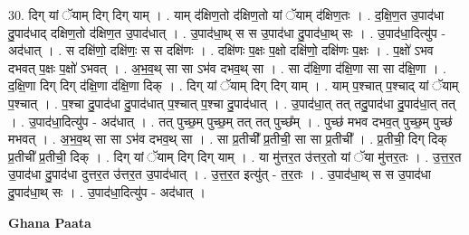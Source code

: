 \documentclass[17pt]{extarticle}
\begin{document}
30. दिग् यां ॅयाम् दिग् दिग् याम् । . याम् द॑क्षिण॒तो द॑क्षिण॒तो यां ॅयाम् द॑क्षिण॒तः । . द॒क्षि॒ण॒त उ॒पाद॑धा दु॒पाद॑धाद् दक्षिण॒तो द॑क्षिण॒त उ॒पाद॑धात् । . उ॒पाद॑धा॒थ् स स उ॒पाद॑धा दु॒पाद॑धा॒थ् सः । . उ॒पाद॑धा॒दित्यु॑प - अद॑धात् । . स दक्षि॑णो॒ दक्षि॑णः॒ स स दक्षि॑णः । . दक्षि॑णः प॒क्षः प॒क्षो दक्षि॑णो॒ दक्षि॑णः प॒क्षः । . प॒क्षो॑ ऽभव दभवत् प॒क्षः प॒क्षो॑ ऽभवत् । . अ॒भ॒व॒थ् सा सा ऽभ॑व दभव॒थ् सा । . सा द॑क्षि॒णा द॑क्षि॒णा सा सा द॑क्षि॒णा । . द॒क्षि॒णा दिग् दिग् द॑क्षि॒णा द॑क्षि॒णा दिक् । . दिग् यां ॅयाम् दिग् दिग् याम् । . याम् प॒श्चात् प॒श्चाद् यां ॅयाम् प॒श्चात् । . प॒श्चा दु॒पाद॑धा दु॒पाद॑धात् प॒श्चात् प॒श्चा दु॒पाद॑धात् । . उ॒पाद॑धा॒त् तत् तदु॒पाद॑धा दु॒पाद॑धा॒त् तत् । . उ॒पाद॑धा॒दित्यु॑प - अद॑धात् । . तत् पुच्छ॒म् पुच्छ॒म् तत् तत् पुच्छ᳚म् । . पुच्छ॑ मभव दभव॒त् पुच्छ॒म् पुच्छ॑ मभवत् । . अ॒भ॒व॒थ् सा सा ऽभ॑व दभव॒थ् सा । . सा प्र॒तीची᳚ प्र॒तीची॒ सा सा प्र॒तीची᳚ । . प्र॒तीची॒ दिग् दिक् प्र॒तीची᳚ प्र॒तीची॒ दिक् । . दिग् यां ॅयाम् दिग् दिग् याम् । . या मु॑त्तर॒त उ॑त्तर॒तो यां ॅया मु॑त्तर॒तः । . उ॒त्त॒र॒त उ॒पाद॑धा दु॒पाद॑धा दुत्तर॒त उ॑त्तर॒त उ॒पाद॑धात् । . उ॒त्त॒र॒त इत्यु॑त् - त॒र॒तः । . उ॒पाद॑धा॒थ् स स उ॒पाद॑धा दु॒पाद॑धा॒थ् सः । . उ॒पाद॑धा॒दित्यु॑प - अद॑धात् । \newline

\textbf{Ghana Paata } \newline
\end{document}
